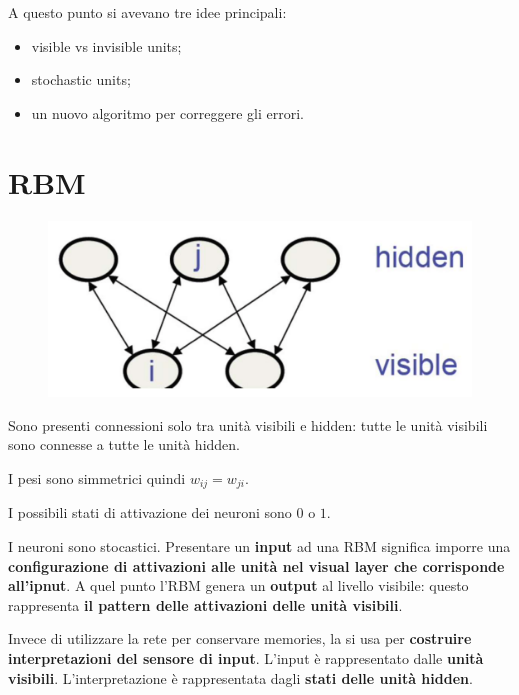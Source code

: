 A questo punto si avevano tre idee principali:
\begin{itemize}
    \item visible vs invisible units;
    \item stochastic units;
    \item un nuovo algoritmo per correggere gli errori.
\end{itemize}
\newpage
\section{RBM}
\begin{figure}[!h]
    \includegraphics[scale=.8]{images/rbm/rbm.png}
    \centering
\end{figure}


Sono presenti connessioni solo tra unità visibili e hidden: tutte le unità visibili sono connesse a tutte le unità hidden.



I pesi sono simmetrici quindi $w_{ij}=w_{ji}$.


I possibili stati di attivazione dei neuroni sono $0$ o $1$.



I neuroni sono stocastici.
\newline
\newline
Presentare un \textbf{input} ad una RBM significa imporre una \textbf{configurazione di attivazioni alle unità nel visual layer che corrisponde all'ipnut}. A quel punto l'RBM genera un \textbf{output} al livello visibile: questo rappresenta \textbf{il pattern delle  attivazioni delle unità visibili}.


Invece di utilizzare la rete per conservare memories, la si usa per \textbf{costruire interpretazioni del sensore di input}. L'input è rappresentato dalle \textbf{unità visibili}. L'interpretazione è rappresentata dagli \textbf{stati delle unità hidden}.



